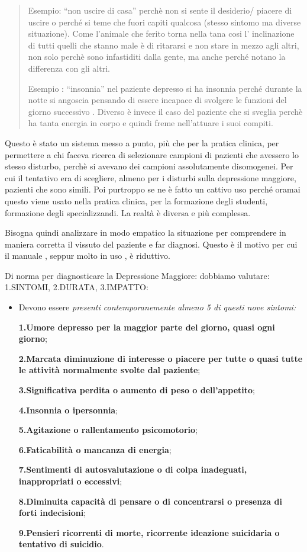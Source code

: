 \documentclass[]{article}
\begin{document}
\begin{quote}
Esempio: ``non uscire di casa'' perchè non si sente il desiderio/
piacere di uscire o perché si teme che fuori capiti qualcosa (stesso
sintomo ma diverse situazione). Come l'animale che ferito torna nella
tana cosi l' inclinazione di tutti quelli che stanno male è di ritararsi
e non stare in mezzo agli altri, non solo perchè sono infastiditi dalla
gente, ma anche perché notano la differenza con gli altri.

Esempio : ``insonnia'' nel paziente depresso si ha insonnia perché
durante la notte si angoscia pensando di essere incapace di svolgere le
funzioni del giorno successivo . Diverso è invece il caso del paziente
che si sveglia perchè ha tanta energia in corpo e quindi freme
nell'attuare i suoi compiti.
\end{quote}

Questo è stato un sistema messo a punto, più che per la pratica clinica,
per permettere a chi faceva ricerca di selezionare campioni di pazienti
che avessero lo stesso disturbo, perchè si avevano dei campioni
assolutamente disomogenei. Per cui il tentativo era di scegliere, almeno
per i disturbi sulla depressione maggiore, pazienti che sono simili. Poi
purtroppo se ne è fatto un cattivo uso perché oramai questo viene usato
nella pratica clinica, per la formazione degli studenti, formazione
degli specializzandi. La realtà è diversa e più complessa.

Bisogna quindi analizzare in modo empatico la situazione per comprendere
in maniera corretta il vissuto del paziente e far diagnosi. Questo è il
motivo per cui il manuale , seppur molto in uso , è riduttivo.

Di norma per diagnosticare la Depressione Maggiore: dobbiamo valutare:
1.SINTOMI, 2.DURATA, 3.IMPATTO:

\begin{itemize}
\item
  Devono essere \emph{\emph{presenti contemporanemente almeno 5 di
  questi nove sintomi:}}

  \textbf{1.Umore depresso per la maggior parte del giorno, quasi ogni
  giorno};

  \textbf{2.Marcata diminuzione di interesse o piacere per tutte o quasi
  tutte le attività normalmente svolte dal paziente};

  \textbf{3.Significativa perdita o aumento di peso o dell'appetito};

  \textbf{4.Insonnia o ipersonnia};

  \textbf{5.Agitazione o rallentamento psicomotorio};

  \textbf{6.Faticabilità o mancanza di energia};

  \textbf{7.Sentimenti di autosvalutazione o di colpa inadeguati,
  inappropriati o eccessivi};

  \textbf{8.Diminuita capacità di pensare o di concentrarsi o presenza
  di forti indecisioni};

  \textbf{9.Pensieri ricorrenti di morte, ricorrente ideazione
  suicidaria o tentativo di suicidio}.
\end{itemize}
\end{document}
